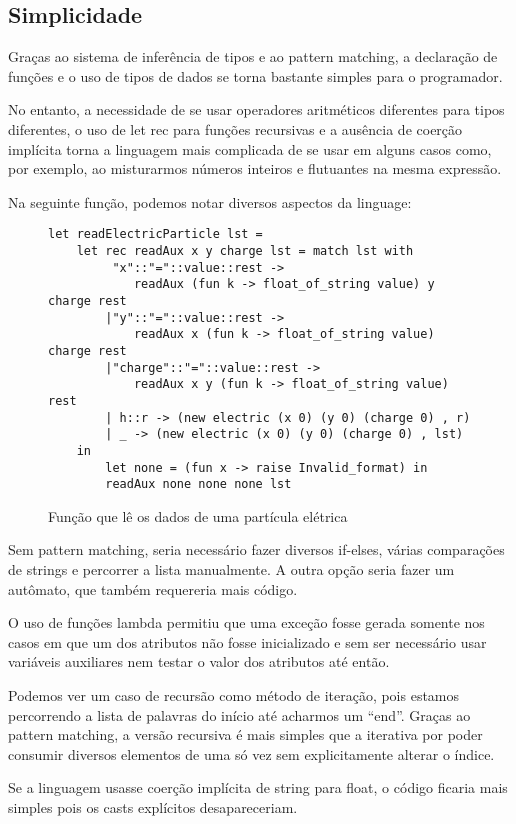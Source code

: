 \documentclass[a4paper,10pt]{article}
\begin{document}
	\subsection{Simplicidade}
		Graças ao sistema de inferência de tipos e ao pattern matching, a declaração de funções e o uso de tipos de dados se torna bastante simples para o programador.
		
		No entanto, a necessidade de se usar operadores aritméticos diferentes para tipos diferentes, o uso de let rec para funções recursivas e a ausência de coerção implícita torna a linguagem mais complicada de se usar em alguns casos como, por exemplo, ao misturarmos números inteiros e flutuantes na mesma expressão.
		
		Na seguinte função, podemos notar diversos aspectos da linguage:
		\begin{figure}
\begin{lstlisting}
let readElectricParticle lst =
	let rec readAux x y charge lst = match lst with
		 "x"::"="::value::rest -> 
			readAux (fun k -> float_of_string value) y charge rest
		|"y"::"="::value::rest -> 
			readAux x (fun k -> float_of_string value) charge rest
		|"charge"::"="::value::rest ->
			readAux x y (fun k -> float_of_string value) rest
		| h::r -> (new electric (x 0) (y 0) (charge 0) , r)
		| _ -> (new electric (x 0) (y 0) (charge 0) , lst)
	in
		let none = (fun x -> raise Invalid_format) in
		readAux none none none lst
	\end{lstlisting}
		\caption{Função que lê os dados de uma partícula elétrica}
		\label{readElectricParticle}
		\end{figure}
		
		Sem pattern matching, seria necessário fazer diversos if-elses, várias comparações de strings e percorrer a lista manualmente. A outra opção seria fazer um autômato, que também requereria mais código.
		
		O uso de funções lambda permitiu que uma exceção fosse gerada somente nos casos em que um dos atributos não fosse inicializado e sem ser necessário usar variáveis auxiliares nem testar o valor dos atributos até então.
		
		Podemos ver um caso de recursão como método de iteração, pois estamos percorrendo a lista de palavras do início até acharmos um ``end''. Graças ao pattern matching, a versão recursiva é mais simples que a iterativa por poder consumir diversos elementos de uma só vez sem explicitamente alterar o índice.
		
		Se a linguagem usasse coerção implícita de string para float, o código ficaria mais simples pois os casts explícitos desapareceriam.
		
\end{document}
